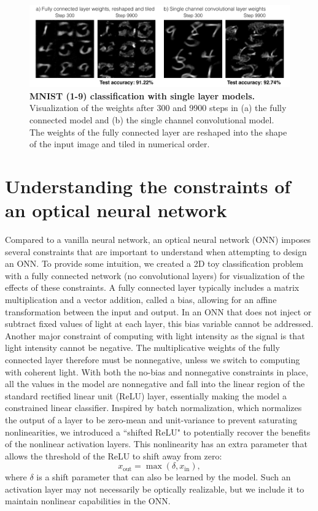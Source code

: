 \documentclass[fleqn,10pt]{wlscirepsupp}
\begin{document}
\begin{figure}[htbp]
\centering
\includegraphics[width=.95\linewidth]{mnist.pdf}
\setlength\belowcaptionskip{-8pt}
\caption{\textbf{MNIST (1-9) classification with single layer models.} Visualization of the weights after 300 and 9900 steps in (a) the fully connected model and (b) the single channel convolutional model. The weights of the fully connected layer are reshaped into the shape of the input image and tiled in numerical order.}
\label{fig:mnist}
\end{figure}


\newpage

\section{Understanding the constraints of an optical neural network}

Compared to a vanilla neural network, an optical neural network (ONN) imposes several constraints that are important to understand when attempting to design an ONN. To provide some intuition, we created a 2D toy classification problem with a fully connected network (no convolutional layers) for visualization of the effects of these constraints. A fully connected layer typically includes a matrix multiplication and a vector addition, called a bias, allowing for an affine transformation between the input and output. In an ONN that does not inject or subtract fixed values of light at each layer, this bias variable cannot be addressed. Another major constraint of computing with light intensity as the signal is that light intensity cannot be negative. The multiplicative weights of the fully connected layer therefore must be nonnegative, unless we switch to computing with coherent light. With both the no-bias and nonnegative constraints in place, all the values in the model are nonnegative and fall into the linear region of the standard rectified linear unit (ReLU) layer, essentially making the model a constrained linear classifier. Inspired by batch normalization, which normalizes the output of a layer to be zero-mean and unit-variance to prevent saturating nonlinearities\cite{batchnorm}, we introduced a ``shifted ReLU" to potentially recover the benefits of the nonlinear activation layers. This nonlinearity has an extra parameter that allows the threshold of the ReLU to shift away from zero:
\begin{equation}
x_\text{out} = \max(\delta, x_\text{in}),
\end{equation} 
where $\delta$ is a shift parameter that can also be learned by the model. Such an activation layer may not necessarily be optically realizable, but we include it to maintain nonlinear capabilities in the ONN.
\end{document}
